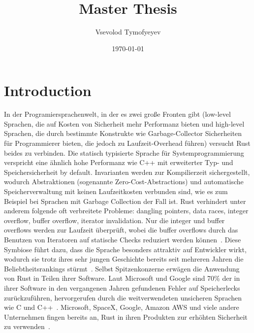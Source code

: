 \documentclass{article}
\begin{document}
\title{Master Thesis}
\author{Vsevolod Tymofyeyev}
\date{\today}
\maketitle

\tableofcontents
\newpage
\section{Introduction}
In der Programiersprachenwelt, in der es zwei große Fronten gibt (low-level Sprachen, die auf Kosten von Sicherheit mehr Performanz bieten und high-level Sprachen, die durch bestimmte Konstrukte wie Garbage-Collector Sicherheiten für Programmierer bieten, die jedoch zu Laufzeit-Overhead führen) versucht Rust beides zu verbinden. Die statisch typisierte Sprache für Systemprogrammierung verspricht eine ähnlich hohe Performanz wie C++ mit erweiterter Typ- und Speichersicherheit by default. Invarianten werden zur Kompilierzeit sichergestellt, wodurch Abstraktionen (sogenannte Zero-Cost-Abstractions) und automatische Speicherverwaltung mit keinen Laufzeitkosten verbunden sind, wie es zum Beispiel bei Sprachen mit Garbage Collection der Fall ist. Rust verhindert unter anderem folgende oft verbreitete Probleme: dangling pointers, data races, integer overflow, buffer overflow, iterator invalidation. Nur die integer und  buffer overflows werden zur Laufzeit überprüft, wobei die buffer overflows durch das Benutzen von Iteratoren auf statische Checks reduziert werden können~\cite{Anderson2016}. Diese Symbiose führt dazu, dass die Sprache besonders attraktiv auf Entwickler wirkt, wodurch sie trotz ihres sehr jungen Geschichte bereits seit mehreren Jahren die Beliebtheitsrankings stürmt~\cite{StackOverflow2020}. Selbst Spitzenkonzerne erwägen die Anwendung von Rust in Teilen ihrer Software. Laut Microsoft und Google sind 70\% der in ihrer Software in den vergangenen Jahren gefundenen Fehler auf Speicherlecks zurückzuführen, hervorgerufen durch die weitverwendeten unsicheren Sprachen wie C und C++~\cite{Microsoft2019MemoryBugs, RustInAndroid}. Microsoft, SpaceX, Google, Amazon AWS und viele andere Unternehmen fingen bereits an, Rust in ihren Produkten zur erhöhten Sicherheit zu verwenden~\cite{MicrosoftJoinsRust, AmazonLovesRust, RustInAndroid, GoogleRustFoundation}.
\end{document}
